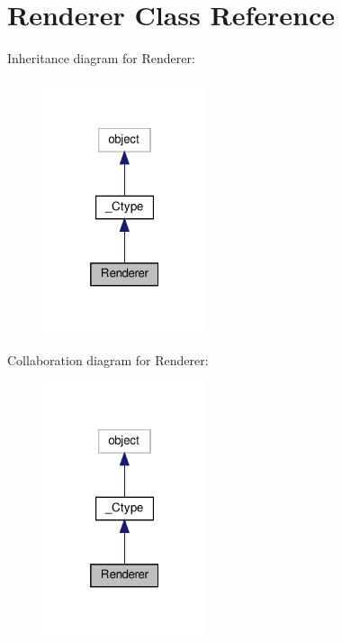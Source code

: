 \hypertarget{classvlc_1_1_renderer}{}\section{Renderer Class Reference}
\label{classvlc_1_1_renderer}


Inheritance diagram for Renderer\+:
\nopagebreak
\begin{figure}[H]
\begin{center}
\leavevmode
\includegraphics[width=136pt]{classvlc_1_1_renderer__inherit__graph}
\end{center}
\end{figure}


Collaboration diagram for Renderer\+:
\nopagebreak
\begin{figure}[H]
\begin{center}
\leavevmode
\includegraphics[width=136pt]{classvlc_1_1_renderer__coll__graph}
\end{center}
\end{figure}
